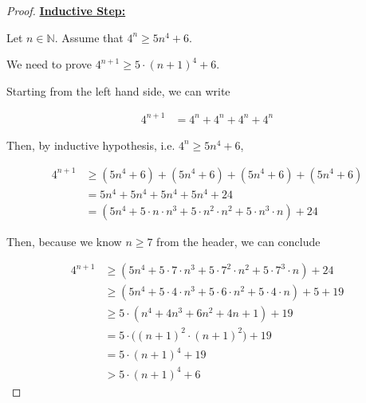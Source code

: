 \documentclass[12pt]{article}
\begin{document}
\begin{itemize}
\begin{proof}
        \bigskip

        \underline{\textbf{Inductive Step:}}

        \bigskip

        Let $n \in \mathbb{N}$. Assume that $4^n \geq 5n^4 + 6$.

        \bigskip

        We need to prove $4^{n+1} \geq 5 \cdot (n+1)^4 + 6$.

        \bigskip

        Starting from the left hand side, we can write

        \begin{align}
        4^{n+1} &= 4^n + 4^n + 4^n + 4^n
        \end{align}

        \bigskip

        Then, by inductive hypothesis, i.e. $4^n \geq 5n^4 + 6$,

        \begin{align}
        4^{n+1} &\geq (5n^4 + 6) + (5n^4 + 6) + (5n^4 + 6) + (5n^4 + 6)\\
        &= 5n^4 + 5n^4 + 5n^4 + 5n^4 + 24\\
        &= (5n^4 + 5 \cdot n \cdot n^3 + 5 \cdot n^2 \cdot n^2 + 5 \cdot n^3 \cdot n) + 24
        \end{align}

        \bigskip

        Then, because we know $n \geq 7$ from the header, we can conclude

        \begin{align}
        4^{n+1} &\geq (5n^4 + 5 \cdot 7 \cdot n^3 + 5 \cdot 7^2 \cdot n^2 + 5 \cdot 7^3 \cdot n) + 24\\
        &\geq (5n^4 + 5 \cdot 4 \cdot n^3 + 5 \cdot 6 \cdot n^2 + 5 \cdot 4 \cdot n) + 5 + 19\\
        &\geq 5 \cdot (n^4 + 4n^3 + 6n^2 + 4n + 1) + 19\\
        &= 5 \cdot \bigl((n+1)^2 \cdot (n+1)^2 \bigr) + 19\\
        &= 5 \cdot (n+1)^4 + 19\\
        &> 5 \cdot (n+1)^4 + 6
        \end{align}
    \end{proof}





\end{itemize}
\end{document}
